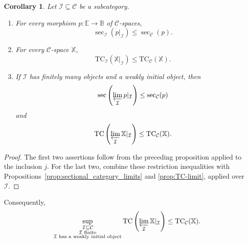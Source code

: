 \documentclass[12pt]{amsart}
\newtheorem{cor}[teo]{Corollary}
\theoremstyle{definition}
\theoremstyle{remark}
\numberwithin{figure}{section}%
\newcommand{\CC}{\mathcal{C}}
\newcommand{\TC}{\mathrm{TC}}
\newcommand{\X}{\mathbb{X}}
\newcommand{\Ee}{\mathbb{E}}
\newcommand{\Bb}{\mathbb{B}}
\begin{document}
\begin{cor}
\label{cor:restriction-sectional}
\label{cor:subcategory-limit-sectional}
\label{cor:restriction-TC}
\label{cor:subcategory-limit-TC}
Let $\mathcal I\subseteq\CC$ be a subcategory.
\begin{enumerate}
    \item For every morphism $p\colon\Ee\to\Bb$ of $\CC$-spaces,
    \[
    \sec_{\mathcal I}(p|_{\mathcal I})
    \leq
    \sec_{\CC}(p).
    \]

    \item For every $\CC$-space $\X$,
    \[
    \TC_{\mathcal I}(\X|_{\mathcal I})
    \leq
    \TC_{\CC}(\X).
    \]

    \item If $\mathcal I$ has finitely many objects and a weakly initial
    object, then
    \[
    \sec\left(\varprojlim_{\mathcal I}p|_{\mathcal I}\right)
    \leq
    \sec_{\CC}(p)
    \]
    and
    \[
    \TC\left(\varprojlim_{\mathcal I}\X|_{\mathcal I}\right)
    \leq
    \TC_{\CC}(\X).
    \]
\end{enumerate}
\end{cor}

\begin{proof}
The first two assertions follow from the preceding proposition applied
to the inclusion $j$. For the last two, combine these restriction
inequalities with Propositions~\ref{prop:sectional_category_limits} and
\ref{prop:TC-limit}, applied over $\mathcal I$.
\end{proof}

Consequently,
\[
\sup_{\substack{
\mathcal I\subseteq\CC\\
\mathcal I\text{ finite}\\
\mathcal I\text{ has a weakly initial object}
}}
\TC\left(\varprojlim_{\mathcal I}\X|_{\mathcal I}\right)
\leq
\TC_{\CC}(\X).
\]


\end{document}
